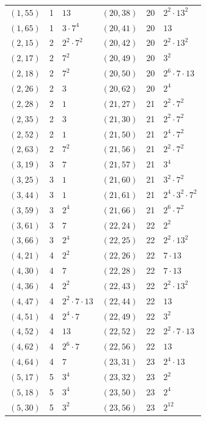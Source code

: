 \documentclass[11pt]{article}
\begin{document}
\begin{longtable}{@{}lrl@{\qquad}lrl@{}}
$(1,55)$ & 1 & $13$ & $(20,38)$ & 20 & $2^{2}\cdot 13^{2}$\\
$(1,65)$ & 1 & $3\cdot 7^{4}$ & $(20,41)$ & 20 & $13$\\
$(2,15)$ & 2 & $2^{2}\cdot 7^{2}$ & $(20,42)$ & 20 & $2^{2}\cdot 13^{2}$\\
$(2,17)$ & 2 & $7^{2}$ & $(20,49)$ & 20 & $3^{2}$\\
$(2,18)$ & 2 & $7^{2}$ & $(20,50)$ & 20 & $2^{6}\cdot 7\cdot 13$\\
$(2,26)$ & 2 & $3$ & $(20,62)$ & 20 & $2^{4}$\\
$(2,28)$ & 2 & $1$ & $(21,27)$ & 21 & $2^{2}\cdot 7^{2}$\\
$(2,35)$ & 2 & $3$ & $(21,30)$ & 21 & $2^{2}\cdot 7^{2}$\\
$(2,52)$ & 2 & $1$ & $(21,50)$ & 21 & $2^{4}\cdot 7^{2}$\\
$(2,63)$ & 2 & $7^{2}$ & $(21,56)$ & 21 & $2^{2}\cdot 7^{2}$\\
$(3,19)$ & 3 & $7$ & $(21,57)$ & 21 & $3^{4}$\\
$(3,25)$ & 3 & $1$ & $(21,60)$ & 21 & $3^{2}\cdot 7^{2}$\\
$(3,44)$ & 3 & $1$ & $(21,61)$ & 21 & $2^{4}\cdot 3^{2}\cdot 7^{2}$\\
$(3,59)$ & 3 & $2^{4}$ & $(21,66)$ & 21 & $2^{6}\cdot 7^{2}$\\
$(3,61)$ & 3 & $7$ & $(22,24)$ & 22 & $2^{2}$\\
$(3,66)$ & 3 & $2^{4}$ & $(22,25)$ & 22 & $2^{2}\cdot 13^{2}$\\
$(4,21)$ & 4 & $2^{2}$ & $(22,26)$ & 22 & $7\cdot 13$\\
$(4,30)$ & 4 & $7$ & $(22,28)$ & 22 & $7\cdot 13$\\
$(4,36)$ & 4 & $2^{2}$ & $(22,43)$ & 22 & $2^{2}\cdot 13^{2}$\\
$(4,47)$ & 4 & $2^{2}\cdot 7\cdot 13$ & $(22,44)$ & 22 & $13$\\
$(4,51)$ & 4 & $2^{4}\cdot 7$ & $(22,49)$ & 22 & $3^{2}$\\
$(4,52)$ & 4 & $13$ & $(22,52)$ & 22 & $2^{2}\cdot 7\cdot 13$\\
$(4,62)$ & 4 & $2^{6}\cdot 7$ & $(22,56)$ & 22 & $13$\\
$(4,64)$ & 4 & $7$ & $(23,31)$ & 23 & $2^{4}\cdot 13$\\
$(5,17)$ & 5 & $3^{4}$ & $(23,32)$ & 23 & $2^{2}$\\
$(5,18)$ & 5 & $3^{4}$ & $(23,50)$ & 23 & $2^{4}$\\
$(5,30)$ & 5 & $3^{2}$ & $(23,56)$ & 23 & $2^{12}$\\

\end{longtable}
\end{document}
